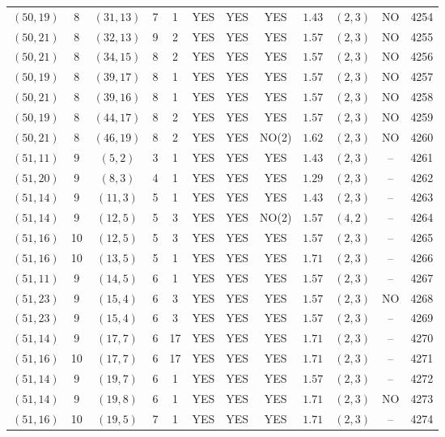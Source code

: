 \begin{longtable}{|c|c|c|c|c|c|c|c|c|c|c|c|}
$(50,19)$ & 8 & $(31,13)$ & 7 & 1 & YES & YES & YES & $1.43$ & $(2,3)$ & NO & 4254\\
$(50,21)$ & 8 & $(32,13)$ & 9 & 2 & YES & YES & YES & $1.57$ & $(2,3)$ & NO & 4255\\
$(50,21)$ & 8 & $(34,15)$ & 8 & 2 & YES & YES & YES & $1.57$ & $(2,3)$ & NO & 4256\\
$(50,19)$ & 8 & $(39,17)$ & 8 & 1 & YES & YES & YES & $1.57$ & $(2,3)$ & NO & 4257\\
$(50,21)$ & 8 & $(39,16)$ & 8 & 1 & YES & YES & YES & $1.57$ & $(2,3)$ & NO & 4258\\
$(50,19)$ & 8 & $(44,17)$ & 8 & 2 & YES & YES & YES & $1.57$ & $(2,3)$ & NO & 4259\\
$(50,21)$ & 8 & $(46,19)$ & 8 & 2 & YES & YES & NO(2) & $1.62$ & $(2,3)$ & NO & 4260\\
$(51,11)$ & 9 & $(5,2)$ & 3 & 1 & YES & YES & YES & $1.43$ & $(2,3)$ & -- & 4261\\
$(51,20)$ & 9 & $(8,3)$ & 4 & 1 & YES & YES & YES & $1.29$ & $(2,3)$ & -- & 4262\\
$(51,14)$ & 9 & $(11,3)$ & 5 & 1 & YES & YES & YES & $1.43$ & $(2,3)$ & -- & 4263\\
$(51,14)$ & 9 & $(12,5)$ & 5 & 3 & YES & YES & NO(2) & $1.57$ & $(4,2)$ & -- & 4264\\
$(51,16)$ & 10 & $(12,5)$ & 5 & 3 & YES & YES & YES & $1.57$ & $(2,3)$ & -- & 4265\\
$(51,16)$ & 10 & $(13,5)$ & 5 & 1 & YES & YES & YES & $1.71$ & $(2,3)$ & -- & 4266\\
$(51,11)$ & 9 & $(14,5)$ & 6 & 1 & YES & YES & YES & $1.57$ & $(2,3)$ & -- & 4267\\
$(51,23)$ & 9 & $(15,4)$ & 6 & 3 & YES & YES & YES & $1.57$ & $(2,3)$ & NO & 4268\\
$(51,23)$ & 9 & $(15,4)$ & 6 & 3 & YES & YES & YES & $1.57$ & $(2,3)$ & -- & 4269\\
$(51,14)$ & 9 & $(17,7)$ & 6 & 17 & YES & YES & YES & $1.71$ & $(2,3)$ & -- & 4270\\
$(51,16)$ & 10 & $(17,7)$ & 6 & 17 & YES & YES & YES & $1.71$ & $(2,3)$ & -- & 4271\\
$(51,14)$ & 9 & $(19,7)$ & 6 & 1 & YES & YES & YES & $1.57$ & $(2,3)$ & -- & 4272\\
$(51,14)$ & 9 & $(19,8)$ & 6 & 1 & YES & YES & YES & $1.71$ & $(2,3)$ & NO & 4273\\
$(51,16)$ & 10 & $(19,5)$ & 7 & 1 & YES & YES & YES & $1.71$ & $(2,3)$ & -- & 4274\\

\end{longtable}
